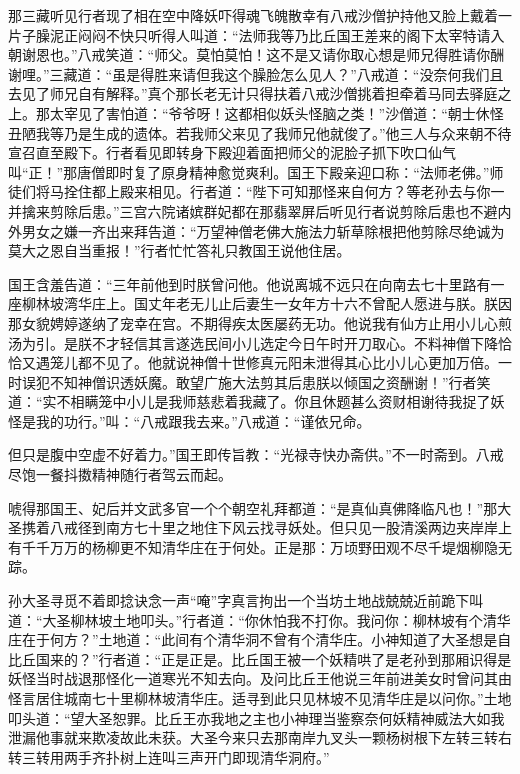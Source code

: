 \documentclass[12pt,UTF8]{ctexbook}
\begin{document}
{	那三藏听见行者现了相在空中降妖吓得魂飞魄散幸有八戒沙僧护持他又脸上戴着一片子臊泥正闷闷不快只听得人叫道：“法师我等乃比丘国王差来的阁下太宰特请入朝谢恩也。”八戒笑道：“师父。莫怕莫怕！这不是又请你取心想是师兄得胜请你酬谢哩。”三藏道：“虽是得胜来请但我这个臊脸怎么见人？”八戒道：“没奈何我们且去见了师兄自有解释。”真个那长老无计只得扶着八戒沙僧挑着担牵着马同去驿庭之上。那太宰见了害怕道：“爷爷呀！这都相似妖头怪脑之类！”沙僧道：“朝士休怪丑陋我等乃是生成的遗体。若我师父来见了我师兄他就俊了。”他三人与众来朝不待宣召直至殿下。行者看见即转身下殿迎着面把师父的泥脸子抓下吹口仙气叫“正！”那唐僧即时复了原身精神愈觉爽利。国王下殿亲迎口称：“法师老佛。”师徒们将马拴住都上殿来相见。行者道：“陛下可知那怪来自何方？等老孙去与你一并擒来剪除后患。”三宫六院诸嫔群妃都在那翡翠屏后听见行者说剪除后患也不避内外男女之嫌一齐出来拜告道：“万望神僧老佛大施法力斩草除根把他剪除尽绝诚为莫大之恩自当重报！”行者忙忙答礼只教国王说他住居。
	
	国王含羞告道：“三年前他到时朕曾问他。他说离城不远只在向南去七十里路有一座柳林坡湾华庄上。国丈年老无儿止后妻生一女年方十六不曾配人愿进与朕。朕因那女貌娉婷遂纳了宠幸在宫。不期得疾太医屡药无功。他说我有仙方止用小儿心煎汤为引。是朕不才轻信其言遂选民间小儿选定今日午时开刀取心。不料神僧下降恰恰又遇笼儿都不见了。他就说神僧十世修真元阳未泄得其心比小儿心更加万倍。一时误犯不知神僧识透妖魔。敢望广施大法剪其后患朕以倾国之资酬谢！”行者笑道：“实不相瞒笼中小儿是我师慈悲着我藏了。你且休题甚么资财相谢待我捉了妖怪是我的功行。”叫：“八戒跟我去来。”八戒道：“谨依兄命。
	
	但只是腹中空虚不好着力。”国王即传旨教：“光禄寺快办斋供。”不一时斋到。八戒尽饱一餐抖擞精神随行者驾云而起。
	
	唬得那国王、妃后并文武多官一个个朝空礼拜都道：“是真仙真佛降临凡也！”那大圣携着八戒径到南方七十里之地住下风云找寻妖处。但只见一股清溪两边夹岸岸上有千千万万的杨柳更不知清华庄在于何处。正是那：万顷野田观不尽千堤烟柳隐无踪。
	
	孙大圣寻觅不着即捻诀念一声“唵”字真言拘出一个当坊土地战兢兢近前跪下叫道：“大圣柳林坡土地叩头。”行者道：“你休怕我不打你。我问你：柳林坡有个清华庄在于何方？”土地道：“此间有个清华洞不曾有个清华庄。小神知道了大圣想是自比丘国来的？”行者道：“正是正是。比丘国王被一个妖精哄了是老孙到那厢识得是妖怪当时战退那怪化一道寒光不知去向。及问比丘王他说三年前进美女时曾问其由怪言居住城南七十里柳林坡清华庄。适寻到此只见林坡不见清华庄是以问你。”土地叩头道：“望大圣恕罪。比丘王亦我地之主也小神理当鉴察奈何妖精神威法大如我泄漏他事就来欺凌故此未获。大圣今来只去那南岸九叉头一颗杨树根下左转三转右转三转用两手齐扑树上连叫三声开门即现清华洞府。”
	
}
\end{document}
